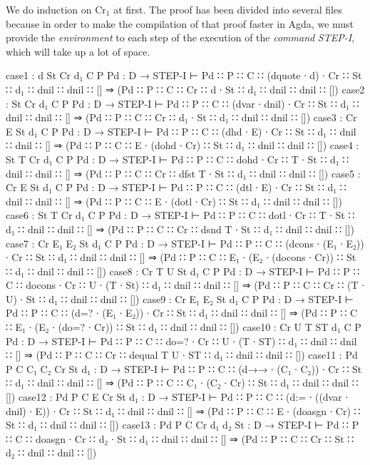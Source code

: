 \documentclass{jfrarticle}
\begin{document}
We do induction on Cr$_1$ at first.
The proof has been divided into several files because in order to make the compilation of that proof faster in Agda, we must provide the \textit{environment} to each step of the execution of the \textit{command} \textit{STEP-I}, which will take up a lot of space. 
\begin{code}[fontsize=\scriptsize]
case1 : {d St Cr d₁ C P Pd : D} 
	→ STEP-I ⊢ Pd ∷ P ∷ C ∷ (dquote ∙ d) ∙ Cr ∷ St ∷ d₁ ∷ dnil ∷ dnil ∷ [] 
		⇒ (Pd ∷ P ∷ C ∷ Cr ∷ d ∙ St ∷ d₁ ∷ dnil ∷ dnil ∷ [])
case2 : {St Cr d₁ C P Pd : D} 
	→ STEP-I ⊢ Pd ∷ P ∷ C ∷ (dvar ∙ dnil) ∙ Cr ∷ St ∷ d₁ ∷ dnil ∷ dnil ∷ [] 
		⇒ (Pd ∷ P ∷ C ∷ Cr ∷ d₁ ∙ St ∷ d₁ ∷ dnil ∷ dnil ∷ [])
case3 : {Cr E St d₁ C P Pd : D} 
	→ STEP-I ⊢ Pd ∷ P ∷ C ∷ (dhd ∙ E) ∙ Cr ∷ St ∷ d₁ ∷ dnil ∷ dnil ∷ [] 
		⇒ (Pd ∷ P ∷ C ∷ E ∙ (dohd ∙ Cr) ∷ St ∷ d₁ ∷ dnil ∷ dnil ∷ [])
case4 : {St T Cr d₁ C P Pd : D} 
	→  STEP-I ⊢ Pd ∷ P ∷ C ∷ dohd ∙ Cr ∷ T ∙ St ∷ d₁ ∷ dnil ∷ dnil ∷ [] 
		⇒ (Pd ∷ P ∷ C ∷ Cr ∷ dfst T ∙ St ∷ d₁ ∷ dnil ∷ dnil ∷ [])
case5 : {Cr E St d₁ C P Pd : D} 
	→ STEP-I ⊢ Pd ∷ P ∷ C ∷ (dtl ∙ E) ∙ Cr ∷ St ∷ d₁ ∷ dnil ∷ dnil ∷ [] 
		⇒ (Pd ∷ P ∷ C ∷ E ∙ (dotl ∙ Cr) ∷ St ∷ d₁ ∷ dnil ∷ dnil ∷ [])
case6 : {St T Cr d₁ C P Pd : D} 
	→ STEP-I ⊢ Pd ∷ P ∷ C ∷ dotl ∙ Cr ∷ T ∙ St ∷ d₁ ∷ dnil ∷ dnil ∷ [] 
		⇒ (Pd ∷ P ∷ C ∷ Cr ∷ dsnd T ∙ St ∷ d₁ ∷ dnil ∷ dnil ∷ [])
case7 : {Cr E₁ E₂ St d₁ C P Pd : D} 
	→  STEP-I ⊢ Pd ∷ P ∷ C ∷ (dcons ∙ (E₁ ∙ E₂)) ∙ Cr ∷ St ∷ d₁ ∷ dnil ∷ dnil ∷ [] 
		⇒ (Pd ∷ P ∷ C ∷ E₁ ∙ (E₂ ∙ (docons ∙ Cr)) ∷ St ∷ d₁ ∷ dnil ∷ dnil ∷ [])
case8 : {Cr T U St d₁ C P Pd : D} 
	→  STEP-I ⊢ Pd ∷ P ∷ C ∷ docons ∙ Cr ∷ U ∙ (T ∙ St) ∷ d₁ ∷ dnil ∷ dnil ∷ [] 
		⇒ (Pd ∷ P ∷ C ∷ Cr ∷ (T ∙ U) ∙ St ∷ d₁ ∷ dnil ∷ dnil ∷ [])
case9 : {Cr E₁ E₂ St d₁ C P Pd : D} 
	→  STEP-I ⊢ Pd ∷ P ∷ C ∷ (d=? ∙ (E₁ ∙ E₂)) ∙ Cr ∷ St ∷ d₁ ∷ dnil ∷ dnil ∷ [] 
		⇒ (Pd ∷ P ∷ C ∷ E₁ ∙ (E₂ ∙ (do=? ∙ Cr)) ∷ St ∷ d₁ ∷ dnil ∷ dnil ∷ [])
case10 : {Cr U T ST d₁ C P Pd : D} 
	→  STEP-I ⊢ Pd ∷ P ∷ C ∷ do=? ∙ Cr ∷ U ∙ (T ∙ ST) ∷ d₁ ∷ dnil ∷ dnil ∷ [] 
		⇒ (Pd ∷ P ∷ C ∷ Cr ∷ dequal T U ∙ ST ∷ d₁ ∷ dnil ∷ dnil ∷ [])
case11 : {Pd P C C₁ C₂ Cr St d₁ : D} 
	→  STEP-I ⊢ Pd ∷ P ∷ C ∷ (d→→ ∙ (C₁ ∙ C₂)) ∙ Cr ∷ St ∷ d₁ ∷ dnil ∷ dnil ∷ [] 
		⇒ (Pd ∷ P ∷ C ∷ C₁ ∙ (C₂ ∙ Cr) ∷ St ∷ d₁ ∷ dnil ∷ dnil ∷ [])
case12 : {Pd P C E Cr St d₁ : D} 
	→  STEP-I ⊢ Pd ∷ P ∷ C ∷ (d:= ∙ ((dvar ∙ dnil) ∙ E)) ∙ Cr ∷ St ∷ d₁ ∷ dnil ∷ dnil ∷ [] 
		⇒ (Pd ∷ P ∷ C ∷ E ∙ (doasgn ∙ Cr) ∷ St ∷ d₁ ∷ dnil ∷ dnil ∷ [])
case13 : {Pd P C Cr d₁ d₂ St : D} 
	→  STEP-I ⊢ Pd ∷ P ∷ C ∷ doasgn ∙ Cr ∷ d₂ ∙ St ∷ d₁ ∷ dnil ∷ dnil ∷ [] 
		⇒ (Pd ∷ P ∷ C ∷ Cr ∷ St ∷ d₂ ∷ dnil ∷ dnil ∷ [])

\end{code}
\end{document}
